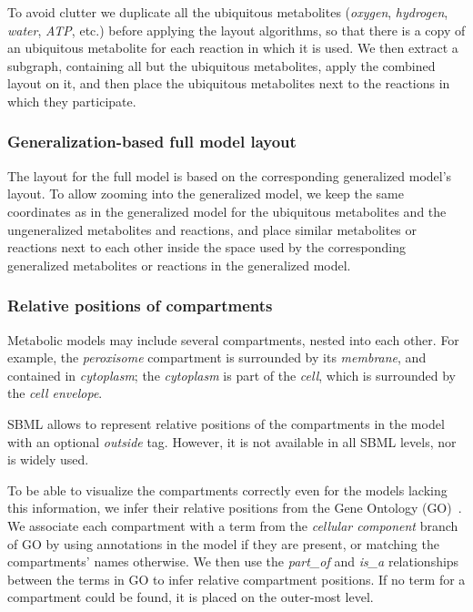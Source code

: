 \documentclass{bmcart}
\begin{document}
To avoid clutter we duplicate all the ubiquitous metabolites (\textit{oxygen}, \textit{hydrogen}, \textit{water}, \textit{ATP}, etc.) before applying the layout algorithms, so that there is a copy of an ubiquitous metabolite for each reaction in which it is used. We then extract a subgraph, containing all but the ubiquitous metabolites, apply the combined layout on it, and then place the ubiquitous metabolites next to the reactions in which they participate.

\subsubsection*{Generalization-based full model layout}
The layout for the full model is based on the corresponding generalized model's layout. To allow zooming into the generalized model, we keep the same coordinates as in the generalized model for the ubiquitous metabolites and the ungeneralized metabolites and reactions, and place similar metabolites or reactions next to each other inside the space used by the corresponding generalized metabolites or reactions in the generalized model.

\subsubsection*{Relative positions of compartments}
Metabolic models may include several compartments, nested into each other. For example, the \emph{peroxisome} compartment is surrounded by its \emph{membrane}, and contained in \emph{cytoplasm}; the \emph{cytoplasm} is part of the \emph{cell}, which is surrounded by the \emph{cell envelope}.

SBML allows to represent relative positions of the compartments in the model with an optional \emph{outside} tag. However, it is not available in all SBML levels, nor is widely used.

To be able to visualize the compartments correctly even for the models lacking this information, we infer their relative positions from the Gene Ontology (GO)~\cite{Ashburner2000}. We associate each compartment with a term from the \emph{cellular component} branch of GO by using annotations in the model if they are present, or matching the compartments' names otherwise. We then use the \emph{part\_of} and \emph{is\_a} relationships between the terms in GO to infer relative compartment positions. If no term for a compartment could be found, it is placed on the outer-most level. 
 
\end{document}
